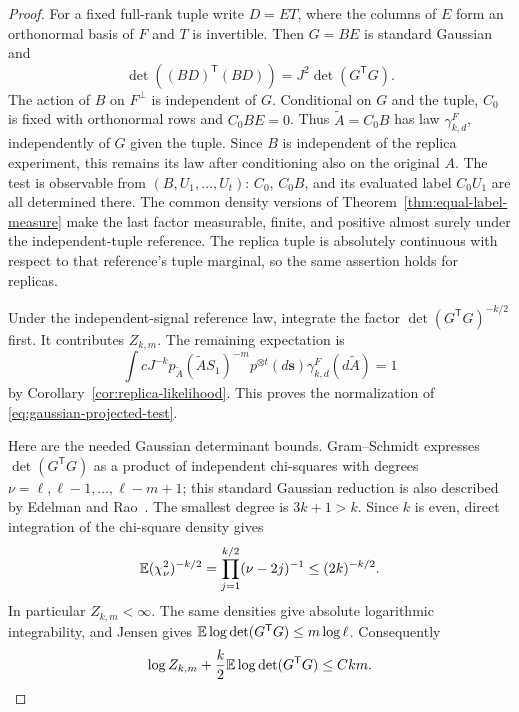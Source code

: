 \begin{proof}
For a fixed full-rank tuple write $D=ET$, where the columns of $E$ form an
orthonormal basis of $F$ and $T$ is invertible. Then $G=BE$ is standard
Gaussian and
\[
 \det((BD)^{\mathsf T}(BD))
 =J^2\det(G^{\mathsf T}G).
\]
The action of $B$ on $F^\perp$ is independent of $G$. Conditional on $G$
and the tuple, $C_0$ is fixed with orthonormal rows and $C_0BE=0$.
Thus $\widetilde A=C_0B$ has law $\gamma_{k,d}^{F}$, independently of
$G$ given the tuple. Since $B$ is independent of the replica experiment,
this remains its law after conditioning also on the original $A$.
The test is observable from $(B,U_1,\ldots,U_t)$:
$C_0$, $C_0B$, and its evaluated label $C_0U_1$ are all determined there.
The common density versions of Theorem~\ref{thm:equal-label-measure} make
the last factor measurable, finite, and positive almost surely under the
independent-tuple reference. The replica tuple is absolutely continuous
with respect to that reference's tuple marginal, so the same assertion
holds for replicas.

Under the independent-signal reference law, integrate the factor
$\det(G^{\mathsf T}G)^{-k/2}$ first. It contributes $Z_{k,m}$.
The remaining expectation is
\[
 \int cJ^{-k}p_{\widetilde A}(\widetilde A S_1)^{-m}
       p^{\otimes t}(d\mathbf s)\gamma_{k,d}^{F}(d\widetilde A)=1
\]
by Corollary~\ref{cor:replica-likelihood}. This proves the normalization
of \eqref{eq:gaussian-projected-test}.

Here are the needed Gaussian determinant bounds. Gram--Schmidt expresses
$\det(G^{\mathsf T}G)$ as a product of independent chi-squares with degrees
$\nu=\ell,\ell-1,\ldots,\ell-m+1$; this standard Gaussian reduction is also
described by Edelman and Rao~\cite[Section 5]{EdelmanRao2005}.
The smallest degree is $3k+1>k$. Since $k$ is even, direct integration of
the chi-square density gives
\[
 \mathbb E(\chi_\nu^2)^{-k/2}
 =\prod_{j=1}^{k/2}(\nu-2j)^{-1}\le(2k)^{-k/2}.
\]
In particular $Z_{k,m}<\infty$. The same densities give absolute
logarithmic integrability, and Jensen gives
$\mathbb E\log\det(G^{\mathsf T}G)\le m\log\ell$. Consequently
\begin{equation}\label{eq:gaussian-wishart-remainder}
 \log Z_{k,m}+\frac{k}{2}\mathbb E\log\det(G^{\mathsf T}G)\le Ckm.
\end{equation}


\end{proof}
